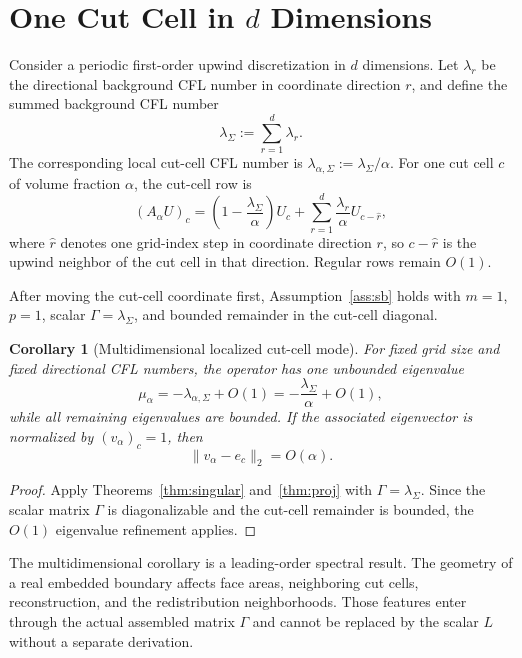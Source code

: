 \documentclass[preprint,12pt]{elsarticle}
\newtheorem{corollary}[theorem]{Corollary}
\begin{document}
\section{One Cut Cell in \texorpdfstring{$d$}{d} Dimensions}
\label{sec:ddim}

Consider a periodic first-order upwind discretization in $d$ dimensions.  Let
$\lambda_r$ be the directional background CFL number in coordinate direction
$r$, and define the summed background CFL number
\[
    \lambda_\Sigma:=\sum_{r=1}^d\lambda_r.
\]
The corresponding local cut-cell CFL number is
$\lambda_{\alpha,\Sigma}:=\lambda_\Sigma/\alpha$.
For one cut cell $c$ of volume fraction $\alpha$, the cut-cell row is
\begin{equation}
    (A_\alpha U)_c
    =
    \left(1-\frac{\lambda_\Sigma}{\alpha}\right)U_c
    +
    \sum_{r=1}^d
    \frac{\lambda_r}{\alpha}U_{c-\hat r},
    \label{eq:Add}
\end{equation}
where $\hat r$ denotes one grid-index step in coordinate direction $r$, so
$c-\hat r$ is the upwind neighbor of the cut cell in that direction.  Regular
rows remain $O(1)$.

After moving the cut-cell coordinate first,
Assumption~\ref{ass:sb} holds with $m=1$, $p=1$, scalar $\Gamma=\lambda_\Sigma$, and bounded remainder in the cut-cell diagonal.

\begin{corollary}[Multidimensional localized cut-cell mode]
\label{thm:ddim}
For fixed grid size and fixed directional CFL numbers, the operator has one
unbounded eigenvalue
\begin{equation}
    \mu_\alpha
    =-\lambda_{\alpha,\Sigma}+O(1)
    =-\frac{\lambda_\Sigma}{\alpha}+O(1),
    \label{eq:mudd}
\end{equation}
while all remaining eigenvalues are bounded.  If the associated eigenvector is
normalized by $(v_\alpha)_c=1$, then
\begin{equation}
    \|v_\alpha-e_c\|_2=O(\alpha).
    \label{eq:vdd}
\end{equation}
\end{corollary}

\begin{proof}
Apply Theorems~\ref{thm:singular} and~\ref{thm:proj} with
$\Gamma=\lambda_\Sigma$.  Since the scalar matrix $\Gamma$ is diagonalizable and the cut-cell
remainder is bounded, the $O(1)$ eigenvalue refinement applies.
\end{proof}

The multidimensional corollary is a leading-order spectral result.  The geometry of a real embedded boundary affects face areas,
neighboring cut cells, reconstruction, and the redistribution neighborhoods.
Those features enter through the actual assembled matrix $\Gamma$ and cannot be
replaced by the scalar $L$ without a separate derivation.
\end{document}
